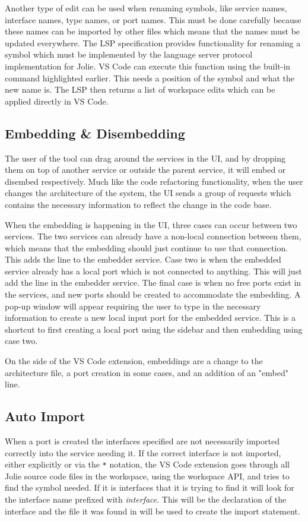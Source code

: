 Another type of edit can be used when renaming symbols, like service names, interface names, type names, or port names. This must be done carefully because these names can be imported by other files which means that the names must be updated everywhere.
The LSP specification provides functionality for renaming a symbol which must be implemented by the language server protocol implementation for Jolie.
VS Code can execute this function using the built-in command highlighted earlier. This needs a position of the symbol and what the new name is. The LSP then returns a list of workspace edits which can be applied directly in VS Code.


\subsection{Embedding \& Disembedding}
The user of the tool can drag around the services in the UI, and by dropping them on top of another service or outside the parent service, it will embed or disembed respectively.
Much like the code refactoring functionality, when the user changes the architecture of the system, the UI sends a group of requests which contains the necessary information to reflect the change in the code base.

When the embedding is happening in the UI, three cases can occur between two services. The two services can already have a non-local connection between them, which means that the embedding should just continue to use that connection. This adds the line  to the embedder service.
Case two is when the embedded service already has a local port which is not connected to anything. This will just add the line  in the embedder service.
The final case is when no free ports exist in the services, and new ports should be created to accommodate the embedding. A pop-up window will appear requiring the user to 
type in the necessary information to create a new local input port for the embedded service. This is a shortcut to first creating a local port using the sidebar and then embedding using case two.

On the side of the VS Code extension, embeddings are a change to the architecture file, a port creation in some cases, and an addition of an "embed" line.

\subsection{Auto Import}
When a port is created the interfaces specified are not necessarily imported correctly into the service needing it.
If the correct interface is not imported, either explicitly or via the \texttt{*} notation,
the VS Code extension goes through all Jolie source code files in the workspace, using the workspace API, and tries to find the symbol needed. If it is interfaces that it is trying to find
it will look for the interface name prefixed with \textit{interface}. This will be the declaration of the interface and the file it was found in will be used to create the import statement.

